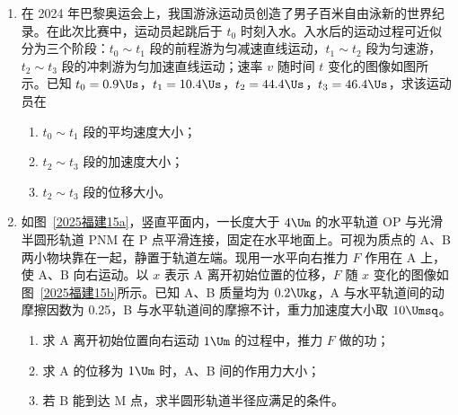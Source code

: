 \documentclass[\gkver]{gaokaozhenti}
\begin{document}
\begin{enumerate}
\item
在 2024 年巴黎奥运会上，我国游泳运动员创造了男子百米自由泳新的世界纪录。在此次比赛中，运动员起跳后于 $t_{0}$ 时刻入水。入水后的运动过程可近似分为三个阶段：$t_{0} \sim t_{1}$ 段的前程游为匀减速直线运动，$t_{1} \sim t_{2}$ 段为匀速游，$t_{2} \sim t_{3}$ 段的冲刺游为匀加速直线运动；速率 $v$ 随时间 $t$ 变化的图像如图所示。已知 $t_{0} = 0.9 \Us$，$t_{1} = 10.4 \Us$，$t_{2} = 44.4 \Us$，$t_{3} = 46.4 \Us$，求该运动员在
\begin{enumerate}
	\item
	$t_{0} \sim t_{1}$ 段的平均速度大小；
	\item
	$t_{2} \sim t_{3}$ 段的加速度大小；
	\item
	$t_{2} \sim t_{3}$ 段的位移大小。
\end{enumerate}

\onepicture[align=right, w=7.29cm]{}

\jdanswer{
\begin{enumerate}
	\item
	$2.4 \Ums$
	\item
	$0.1 \Umsq$
	\item
	$4.2 \Um$
\end{enumerate}
}

\item
如图~\ref{2025福建15a}，竖直平面内，一长度大于 $4 \Um$ 的水平轨道 OP 与光滑半圆形轨道 PNM 在 P 点平滑连接，固定在水平地面上。可视为质点的 A、B 两小物块靠在一起，静置于轨道左端。现用一水平向右推力 $F$ 作用在 A 上，使 A、B 向右运动。以 $x$ 表示 A 离开初始位置的位移，$F$ 随 $x$ 变化的图像如图~\ref{2025福建15b}所示。已知 A、B 质量均为 $0.2 \Ukg$，A 与水平轨道间的动摩擦因数为 0.25，B 与水平轨道间的摩擦不计，重力加速度大小取 $10 \Umsq$。
\begin{enumerate}
	\item
	求 A 离开初始位置向右运动 $1 \Um$ 的过程中，推力 $F$ 做的功；
	\item
	求 A 的位移为 $1 \Um$ 时，A、B 间的作用力大小；
	\item
	若 B 能到达 M 点，求半圆形轨道半径应满足的条件。
\end{enumerate}


\end{enumerate}
\end{document}
